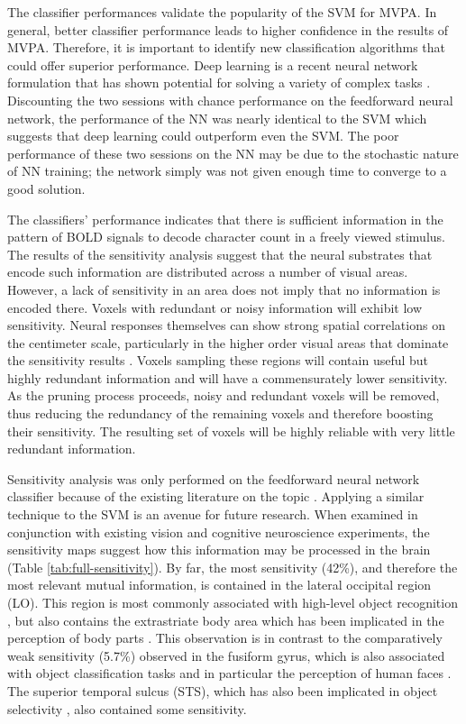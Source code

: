 \documentclass[5p,authoryear]{elsarticle}
\begin{document}
The classifier performances validate the popularity of the SVM for MVPA.
In general, better classifier performance leads to higher confidence in the results of MVPA.
Therefore, it is important to identify new classification algorithms that could offer superior performance.
Deep learning \citep{Hinton2006} is a recent neural network formulation that has shown potential for solving a variety of complex tasks \citep{Ciresan2012}.
Discounting the two sessions with chance performance on the feedforward neural network, the performance of the NN was nearly identical to the SVM which suggests that deep learning could outperform even the SVM.
The poor performance of these two sessions on the NN may be due to the stochastic nature of NN training; the network simply was not given enough time to converge to a good solution.

The classifiers' performance indicates that there is sufficient information in the pattern of BOLD signals to decode character count in a freely viewed stimulus. 
The results of the sensitivity analysis suggest that the neural substrates that encode such information are distributed across a number of visual areas.
However, a lack of sensitivity in an area does not imply that no information is encoded there.
Voxels with redundant or noisy information will exhibit low sensitivity.
Neural responses themselves can show strong spatial correlations on the centimeter scale, particularly in the higher order visual areas that dominate the sensitivity results \citep{Engel1997}. 
Voxels sampling these regions will contain useful but highly redundant information and will have a commensurately lower sensitivity.
As the pruning process proceeds, noisy and redundant voxels will be removed, thus reducing the redundancy of the remaining voxels and therefore boosting their sensitivity.
The resulting set of voxels will be highly reliable with very little redundant information.

Sensitivity analysis was only performed on the feedforward neural network classifier because of the existing literature on the topic \citep{Zurada1994}.
Applying a similar technique to the SVM is an avenue for future research.
When examined in conjunction with existing vision and cognitive neuroscience experiments, the sensitivity maps suggest how this information may be processed in the brain (Table \ref{tab:full-sensitivity}).
By far, the most sensitivity (42\%), and therefore the most relevant mutual information, is contained in the lateral occipital region (LO).
This region is most commonly associated with high-level object recognition \citep{Grill-Spector2001}, but also contains the extrastriate body area which has been implicated in the perception of body parts \citep{Astafiev2004}.
This observation is in contrast to the comparatively weak sensitivity (5.7\%) observed in the fusiform gyrus, which is also associated with object classification tasks and in particular the perception of human faces \citep{Kanwisher1997,Sayres2010}.
The superior temporal sulcus (STS), which has also been implicated in object selectivity \citep{Hasselmo1989,Beauchamp2004}, also contained some sensitivity. 
\end{document}
